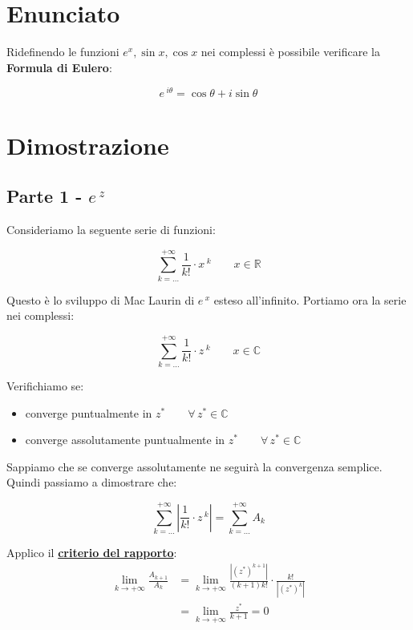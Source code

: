 \documentclass[../dimostrazioni]{subfiles}
\begin{document}
        \section*{Enunciato}

            Ridefinendo le funzioni \( e^x, \sin x, \cos x \) nei complessi è possibile verificare la \textbf{Formula di Eulero}:

                \[  e\,^{i\theta} = \cos \theta + i \sin \theta \]

        \section*{Dimostrazione}

            \subsection*{Parte 1 - \(e\,^z\)}    

                Consideriamo la seguente serie di funzioni:
            
                \[  \sum_{k=\dots}^{+\infty} \frac{1}{k!} \cdot x\,^k \qquad x \in \mathbb{R}  \]

                Questo è lo sviluppo di Mac Laurin di \(e\,^x\) esteso all'infinito. Portiamo ora la serie nei complessi:

                \[  \sum_{k=\dots}^{+\infty} \frac{1}{k!} \cdot z\,^k \qquad x \in \mathbb{C}  \]

                Verifichiamo se:
                \begin{itemize}
                    \item converge puntualmente in \(z^* \qquad \forall \, z^*  \in \mathbb{C}\)
                    \item converge assolutamente puntualmente in \(z^* \qquad \forall \, z^*  \in \mathbb{C}\)
                \end{itemize}
            
                Sappiamo che se converge assolutamente ne seguirà la convergenza semplice. Quindi passiamo a dimostrare che:

                \[  \sum_{k=\dots}^{+\infty} \left| \frac{1}{k!} \cdot z\,^k \right| = \sum_{k=\dots}^{+\infty} A_k \]

                Applico il \textbf{\hyperref[criterioRapportoSerie]{criterio del rapporto}}:
                \begin{align*}
                    \lim_{k \to +\infty} \frac{A_{k+1}}{A_k} &= \lim_{k \to +\infty} \frac{\left|(z^*)^{k+1}\right|}{(k+1)k!} \cdot \frac{k!}{\left|(z^*)^k\right|} \\
                    &= \lim_{k \to +\infty} \frac{z^*}{k+1} = 0
                \end{align*}
\end{document}
